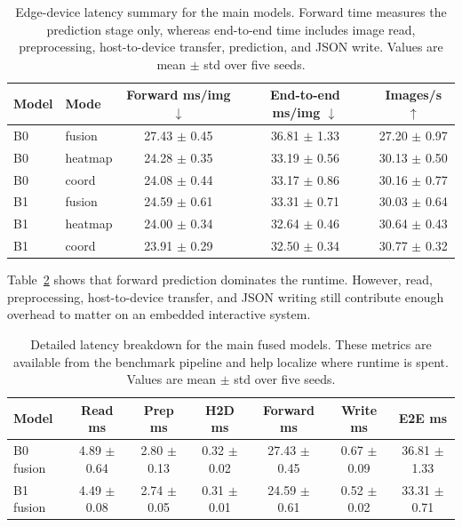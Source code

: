 \documentclass[10pt,letterpaper]{article}
\begin{document}
\begin{table}[H]
\centering
\footnotesize
\caption{Edge-device latency summary for the main models. Forward time measures the prediction stage only, whereas end-to-end time includes image read, preprocessing, host-to-device transfer, prediction, and JSON write. Values are mean $\pm$ std over five seeds.}
\label{tab:latency}
\begin{tabular}{llccc}
\toprule
Model & Mode & Forward ms/img $\downarrow$ & End-to-end ms/img $\downarrow$ & Images/s $\uparrow$ \\
\midrule
B0 & fusion & 27.43 $\pm$ 0.45 & 36.81 $\pm$ 1.33 & 27.20 $\pm$ 0.97 \\
B0 & heatmap & 24.28 $\pm$ 0.35 & 33.19 $\pm$ 0.56 & 30.13 $\pm$ 0.50 \\
B0 & coord & 24.08 $\pm$ 0.44 & 33.17 $\pm$ 0.86 & 30.16 $\pm$ 0.77 \\
B1 & fusion & 24.59 $\pm$ 0.61 & 33.31 $\pm$ 0.71 & 30.03 $\pm$ 0.64 \\
B1 & heatmap & 24.00 $\pm$ 0.34 & 32.64 $\pm$ 0.46 & 30.64 $\pm$ 0.43 \\
B1 & coord & 23.91 $\pm$ 0.29 & 32.50 $\pm$ 0.34 & 30.77 $\pm$ 0.32 \\
\bottomrule
\end{tabular}
\end{table}

Table~\ref{tab:latency_breakdown} shows that forward prediction dominates the runtime. However, read, preprocessing, host-to-device transfer, and JSON writing still contribute enough overhead to matter on an embedded interactive system.

\begin{table}[H]
\centering
\footnotesize
\caption{Detailed latency breakdown for the main fused models. These metrics are available from the benchmark pipeline and help localize where runtime is spent. Values are mean $\pm$ std over five seeds.}
\label{tab:latency_breakdown}
\begin{tabular}{lcccccc}
\toprule
Model & Read ms & Prep ms & H2D ms & Forward ms & Write ms & E2E ms \\
\midrule
B0 fusion & 4.89 $\pm$ 0.64 & 2.80 $\pm$ 0.13 & 0.32 $\pm$ 0.02 & 27.43 $\pm$ 0.45 & 0.67 $\pm$ 0.09 & 36.81 $\pm$ 1.33 \\
B1 fusion & 4.49 $\pm$ 0.08 & 2.74 $\pm$ 0.05 & 0.31 $\pm$ 0.01 & 24.59 $\pm$ 0.61 & 0.52 $\pm$ 0.02 & 33.31 $\pm$ 0.71 \\
\bottomrule
\end{tabular}
\end{table}
\end{document}
